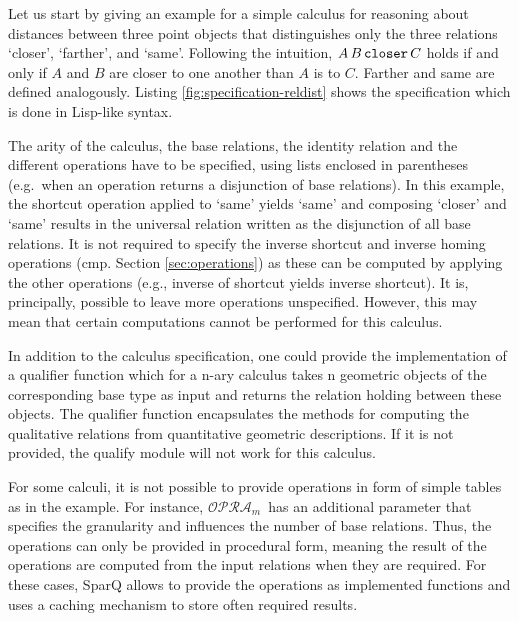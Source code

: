 \documentclass[headsepline]{scrreprt}
\theoremstyle{definition}
\newcommand{\engine}{SparQ}
\newcommand{\opra}{$\mathcal{OPRA}_m$}
\begin{document}
Let us start by giving an example for a simple calculus for
reasoning about distances between three point objects that distinguishes only the three relations `closer', `farther', and `same'. Following the intuition, $A\, B\, \text{\tt closer}\, C$ holds if and only if $A$ and $B$ are closer to one another than $A$ is to $C$. Farther and same are defined analogously.
Listing \ref{fig:specification-reldist} shows the specification which is done in Lisp-like syntax.

\lstset{language=LISP}


The arity of the calculus, the base relations, the identity relation and the
different operations have to be specified, using lists enclosed in parentheses
(e.g.\ when an operation returns a disjunction of base relations). In this
example, the shortcut operation applied to `same' yields `same' and composing
`closer' and `same' results in the universal relation written as the disjunction
of all base relations. It is not required to specify the inverse shortcut and inverse homing operations (cmp. Section \ref{sec:operations}) as these can be computed by applying the other operations (e.g., inverse
of shortcut yields inverse shortcut). It is, principally,
possible to leave more operations unspecified. However, this may mean that certain computations cannot be performed for this calculus.

In addition to the calculus specification, one could provide the
implementation of a qualifier function which for a n-ary calculus takes n geometric objects of the corresponding base type as input
and returns the relation holding between these objects. The qualifier
function  encapsulates the methods for computing the qualitative relations
from quantitative geometric descriptions.
If it is not provided, the qualify module will not work for this calculus.

For some calculi, it is not possible to provide operations in form of simple
tables as in the example. For instance, \opra\ has an additional parameter that specifies the granularity and  influences the number of base relations.  Thus, the operations can only be
provided in procedural form, meaning the result of the operations are
computed from the input relations when they are required. For these cases,
\engine{} allows to provide the operations as implemented functions and
uses a caching mechanism to store often required results.
\end{document}
